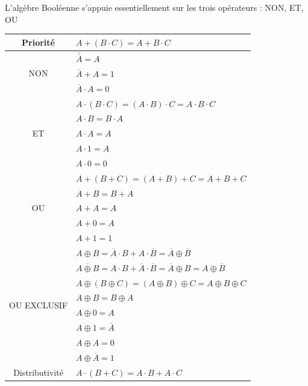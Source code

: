 \documentclass[11pt,a4paper]{article}
\begin{document}
\medskip

L'algèbre Booléenne s'appuie essentiellement sur les trois opérateurs : NON, ET, OU

\begin{center}

\begin{tabular}{| c | l |}
\hline
\multirow[c]{1}{*}[0in]{Priorité} & $ A + ( B \cdot C ) = A + B \cdot C $ \\
\hline
\multirow[c]{3}{*}[0in]{NON} & $ \overline{\overline{A}} = A $     \phantom{$ \overline{\overline{\overline{A}}} $} \\
         & $ \overline{A} + A = 1 $ \\
         & $ \overline{A} \cdot A = 0 $ \\
\hline
\multirow[c]{5}{*}[0in]{ET} & $ A \cdot ( B \cdot C ) = ( A \cdot B ) \cdot C = A \cdot B \cdot C $ \\
         &  $ A \cdot B = B \cdot A $ \\
         & $ A \cdot A = A $ \\
         & $ A \cdot 1 = A $ \\
         & $ A \cdot 0 = 0 $ \\
\hline
\multirow[c]{5}{*}[0in]{OU} & $ A + ( B + C ) = ( A + B ) + C = A + B + C $ \\
         & $ A + B = B + A $ \\
         & $ A + A = A $ \\
         & $ A + 0 = A $ \\
         & $ A + 1 = 1 $ \\
\hline
\multirow[c]{8}{*}[0in]{OU EXCLUSIF} & $ A \oplus B = \overline{A} \cdot B + A \cdot \overline{B} = \overline{A} \oplus \overline{B} $   \phantom{$ \overline{\overline{A}} $} \\
         & $ \overline{A \oplus B} = A \cdot B + \overline{A} \cdot \overline{B} = \overline{A} \oplus B = A \oplus \overline{B} $ \\
         & $ A \oplus ( B \oplus C ) = ( A \oplus B ) \oplus C = A \oplus B \oplus C $ \\
         & $ A \oplus B = B \oplus A $ \\
         & $ A \oplus 0 = A $ \\
         & $ A \oplus 1 = \overline{A} $ \\
         & $ A \oplus A = 0 $ \\
         & $ A \oplus \overline{A} = 1 $ \\
\hline
\multirow[c]{2}{*}[0in]{Distributivité} & $ A \cdot ( B + C ) = A \cdot B + A \cdot C $ \\

\end{tabular}
\end{center}
\end{document}
